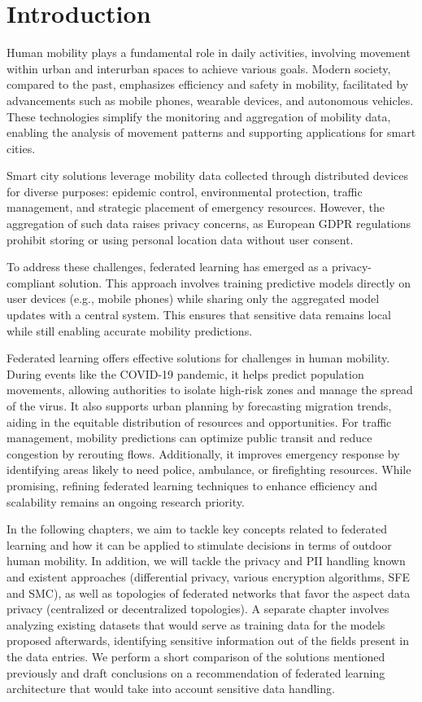 \documentclass[conference]{IEEEtran}
\begin{document}
\section{Introduction}
Human mobility plays a fundamental role in daily activities, involving movement within urban and interurban spaces to achieve various goals. Modern society, compared to the past, emphasizes efficiency and safety in mobility, facilitated by advancements such as mobile phones, wearable devices, and autonomous vehicles. These technologies simplify the monitoring and aggregation of mobility data, enabling the analysis of movement patterns and supporting applications for smart cities.

Smart city solutions leverage mobility data collected through distributed devices for diverse purposes: epidemic control, environmental protection, traffic management, and strategic placement of emergency resources. However, the aggregation of such data raises privacy concerns, as European GDPR regulations prohibit storing or using personal location data without user consent.

To address these challenges, federated learning has emerged as a privacy-compliant solution. This approach involves training predictive models directly on user devices (e.g., mobile phones) while sharing only the aggregated model updates with a central system. This ensures that sensitive data remains local while still enabling accurate mobility predictions.

Federated learning offers effective solutions for challenges in human mobility. During events like the COVID-19 pandemic, it helps predict population movements, allowing authorities to isolate high-risk zones and manage the spread of the virus. It also supports urban planning by forecasting migration trends, aiding in the equitable distribution of resources and opportunities. For traffic management, mobility predictions can optimize public transit and reduce congestion by rerouting flows. Additionally, it improves emergency response by identifying areas likely to need police, ambulance, or firefighting resources. While promising, refining federated learning techniques to enhance efficiency and scalability remains an ongoing research priority.

In the following chapters, we aim to tackle key concepts related to federated learning and how it can be applied to stimulate decisions in terms of outdoor human mobility. In addition, we will tackle the privacy and PII handling known and existent approaches (differential privacy, various encryption algorithms, SFE and SMC), as well as topologies of federated networks that favor the aspect data privacy (centralized or decentralized topologies). A separate chapter involves analyzing existing datasets that would serve as training data for the models proposed afterwards, identifying sensitive information out of the fields present in the data entries. We perform a short comparison of the solutions mentioned previously and draft conclusions on a recommendation of federated learning architecture that would take into account sensitive data handling.
\end{document}
